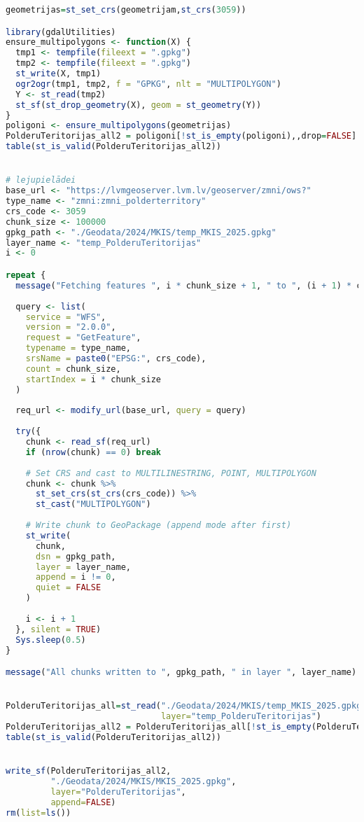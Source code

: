 \documentclass[
]{book}
\begin{document}
\begin{lstlisting}[language=R]
geometrijas=st_set_crs(geometrijam,st_crs(3059))

library(gdalUtilities)
ensure_multipolygons <- function(X) {
  tmp1 <- tempfile(fileext = ".gpkg")
  tmp2 <- tempfile(fileext = ".gpkg")
  st_write(X, tmp1)
  ogr2ogr(tmp1, tmp2, f = "GPKG", nlt = "MULTIPOLYGON")
  Y <- st_read(tmp2)
  st_sf(st_drop_geometry(X), geom = st_geometry(Y))
}
poligoni <- ensure_multipolygons(geometrijas)
PolderuTeritorijas_all2 = poligoni[!st_is_empty(poligoni),,drop=FALSE] # 0
table(st_is_valid(PolderuTeritorijas_all2))


# lejupielādei
base_url <- "https://lvmgeoserver.lvm.lv/geoserver/zmni/ows?"
type_name <- "zmni:zmni_polderterritory"
crs_code <- 3059
chunk_size <- 100000
gpkg_path <- "./Geodata/2024/MKIS/temp_MKIS_2025.gpkg"
layer_name <- "temp_PolderuTeritorijas"
i <- 0

repeat {
  message("Fetching features ", i * chunk_size + 1, " to ", (i + 1) * chunk_size, "...")
  
  query <- list(
    service = "WFS",
    version = "2.0.0",
    request = "GetFeature",
    typename = type_name,
    srsName = paste0("EPSG:", crs_code),
    count = chunk_size,
    startIndex = i * chunk_size
  )
  
  req_url <- modify_url(base_url, query = query)
  
  try({
    chunk <- read_sf(req_url)
    if (nrow(chunk) == 0) break
    
    # Set CRS and cast to MULTILINESTRING, POINT, MULTIPOLYGON
    chunk <- chunk %>%
      st_set_crs(st_crs(crs_code)) %>%
      st_cast("MULTIPOLYGON")
    
    # Write chunk to GeoPackage (append mode after first)
    st_write(
      chunk, 
      dsn = gpkg_path,
      layer = layer_name,
      append = i != 0,
      quiet = FALSE
    )
    
    i <- i + 1
  }, silent = TRUE)
  Sys.sleep(0.5)
}

message("All chunks written to ", gpkg_path, " in layer ", layer_name)


PolderuTeritorijas_all=st_read("./Geodata/2024/MKIS/temp_MKIS_2025.gpkg",
                               layer="temp_PolderuTeritorijas")
PolderuTeritorijas_all2 = PolderuTeritorijas_all[!st_is_empty(PolderuTeritorijas_all),,drop=FALSE] # 0
table(st_is_valid(PolderuTeritorijas_all2))


write_sf(PolderuTeritorijas_all2,
         "./Geodata/2024/MKIS/MKIS_2025.gpkg",
         layer="PolderuTeritorijas",
         append=FALSE)
rm(list=ls())



\end{lstlisting}
\end{document}
